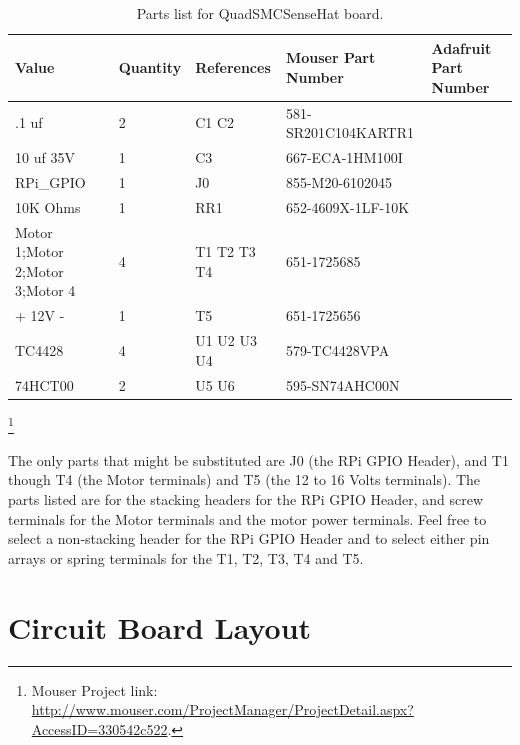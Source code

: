 \begin{table}[htp]
\begin{centering}\begin{tabular}{|l|l|p{1in}|l|p{.5in}|}
\hline
Value&Quantity&References&Mouser Part Number&Adafruit Part Number \\
\hline
.1 uf&2&C1 C2&581-SR201C104KARTR1& \\
\hline
10 uf 35V&1&C3&667-ECA-1HM100I& \\
\hline
RPi\_GPIO&1&J0&855-M20-6102045& \\
\hline
10K Ohms&1&RR1&652-4609X-1LF-10K& \\
\hline
Motor 1;Motor 2;Motor 3;Motor 4&4&T1 T2 T3 T4&651-1725685& \\
\hline
+ 12V -&1&T5&651-1725656& \\
\hline
TC4428&4&U1 U2 U3 U4&579-TC4428VPA& \\
\hline
74HCT00&2&U5 U6&595-SN74AHC00N& \\
\hline
\end{tabular}
\caption{Parts list for QuadSMCSenseHat board.}
\end{centering}\end{table}\footnote{Mouser Project link: 
\url{http://www.mouser.com/ProjectManager/ProjectDetail.aspx?AccessID=330542c522}.}


The only parts that might be substituted are J0 (the RPi GPIO Header), and T1 
though T4 (the Motor terminals) and T5 (the 12 to 16 Volts terminals).  The parts 
listed are for the stacking headers for the RPi GPIO Header, and screw 
terminals for the Motor terminals and the motor power terminals.  Feel free to 
select a non-stacking header for the RPi GPIO Header and to select either pin 
arrays or spring terminals for the T1, T2, T3, T4 and T5.

\section{Circuit Board Layout}

